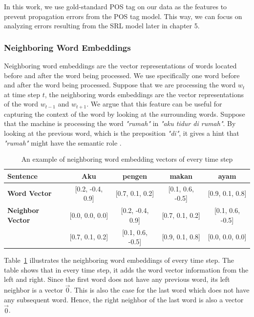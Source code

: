 In this work, we use gold-standard POS tag on our data as the features to prevent propagation errors from the POS tag model. This way, we can focus on analyzing errors resulting from the SRL model later in chapter 5. 

\subsubsection{Neighboring Word Embeddings}
Neighboring word embeddings are the vector representations of words located before and after the word being processed. We use specifically one word before and after the word being processed. Suppose that we are processing the word $w_{t}$ at time step $t$, the neighboring words embeddings are the vector representations of the word $w_{t-1}$ and $w_{t+1}$. We argue that this feature can be useful for capturing the context of the word by looking at the surrounding words. Suppose that the machine is processing the word \textit{"rumah"} in \textit{"aku tidur di rumah"}. By looking at the previous word, which is the preposition \textit{"di"}, it gives a hint that \textit{"rumah"} might have the semantic role \location.

\begin{table}
	\centering
	\caption{An example of neighboring word embedding vectors of every time step}
	\label{tab:examplenwe}
	\begin{tabular}{|lcccc|}
		\hline
		\textbf{Sentence} 				& Aku & pengen & makan & ayam \\
		\hline
		\textbf{Word Vector}		& [0.2, -0.4, 0.9] & [0.7, 0.1, 0.2] & [0.1, 0.6, -0.5] & [0.9, 0.1, 0.8] \\			\textbf{Neighbor Vector}	& [0.0, 0.0, 0.0] & [0.2, -0.4, 0.9] & [0.7, 0.1, 0.2] & [0.1, 0.6, -0.5] \\
													& [0.7, 0.1, 0.2] & [0.1, 0.6, -0.5] &  [0.9, 0.1, 0.8] &  [0.0, 0.0, 0.0] \\
		\hline
	\end{tabular}
\end{table}

Table~\ref{tab:examplenwe} illustrates the neighboring word embeddings of every time step. The table shows that in every time step, it adds the word vector information from the left and right. Since the first word does not have any previous word, its left neighbor is a vector $\vec{0}$. This is also the case for the last word which does not have any subsequent word. Hence, the right neighbor of the last word is also a vector  $\vec{0}$.

